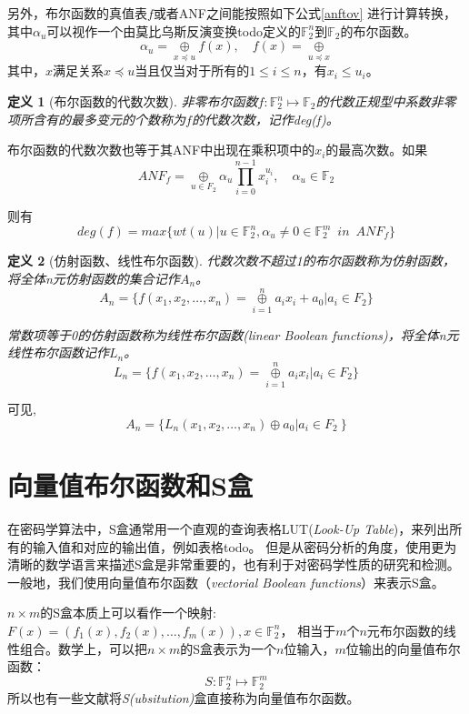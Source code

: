 \documentclass{xduugthesis}
\newtheorem{definition}{定义}
\begin{document}
另外，布尔函数的真值表$f$或者ANF之间能按照如下公式\eqref{anftov} 进行计算转换，其中$\alpha_u$可以视作一个由莫比乌斯反演变换todo定义的$\mathbb{F}_2^n$到$\mathbb{F}_2$的布尔函数。
\begin{equation}
\alpha_u =\mathop{\oplus}\limits_{x\preceq u}f(x), \quad f(x)=\mathop{\oplus}\limits_{u\preceq x} \label{anftov}
\end{equation}
其中，$x$满足关系$x\preceq u$当且仅当对于所有的$1 \le i \le n$，有$x_i \le u_i$。\par

\begin{definition}[布尔函数的代数次数]
    非零布尔函数$f:\mathbb{F}_2^n \mapsto \mathbb{F}_2$的代数正规型中系数非零项所含有的最多变元的个数称为$f$的代数次数，记作deg(f)。
\end{definition}\par
布尔函数的代数次数也等于其ANF中出现在乘积项中的$x_i$的最高次数。如果
$$
ANF_f =\mathop{\oplus}\limits_{u \in F_2}\alpha_u \prod\limits_{i=0}^{n-1} x_i^{u_i},\quad \alpha_u \in \mathbb{F}_2
$$\par
则有
\begin{equation}
    deg(f) = max\{wt(u)|u\in \mathbb{F}_2^n,\alpha_u \ne 0 \in \mathbb{F}_2^m \enspace in \enspace ANF_f \}
\end{equation}\par

\begin{definition}[仿射函数、线性布尔函数]
    代数次数不超过1的布尔函数称为仿射函数，将全体n元仿射函数的集合记作$A_n$。
$$
A_n = \{ f(x_1,x_2,\dots ,x_n) = \mathop{\oplus}\limits_{i=1}^n a_ix_i + a_0 |a_i \in F_2 \}
$$\par
常数项等于0的仿射函数称为线性布尔函数(linear Boolean functions)，将全体n元线性布尔函数记作$L_n$。
$$
L_n = \{ f(x_1,x_2,\dots ,x_n) = \mathop{\oplus}\limits_{i=1}^n a_ix_i |a_i \in F_2 \}
$$
\end{definition}\par
可见,
$$
A_n = \{ L_n(x_1,x_2,\dots ,x_n) \oplus a_0 |a_i \in F_2 \ \}
$$



\section{向量值布尔函数和S盒}

在密码学算法中，S盒通常用一个直观的查询表格LUT(\emph{Look-Up Table})，来列出所有的输入值和对应的输出值，例如表格todo。
但是从密码分析的角度，使用更为清晰的数学语言来描述S盒是非常重要的，也有利于对密码学性质的研究和检测。一般地，我们使用向量值布尔函数（\emph{vectorial Boolean functions}）来表示S盒。\par
$n\times m$的S盒本质上可以看作一个映射:$F(x) = (f_1(x), f_2(x),\dots , f_m(x)), x\in \mathbb{F}_2^n$，
相当于$m$个$n$元布尔函数的线性组合。数学上，可以把$n\times m$的S盒表示为一个$n$位输入，$m$位输出的向量值布尔函数：
$$
S:\mathbb{F}_2^n \mapsto \mathbb{F}_2^m
$$
所以也有一些文献将\emph{S(ubsitution)}盒直接称为向量值布尔函数。\par
\end{document}
